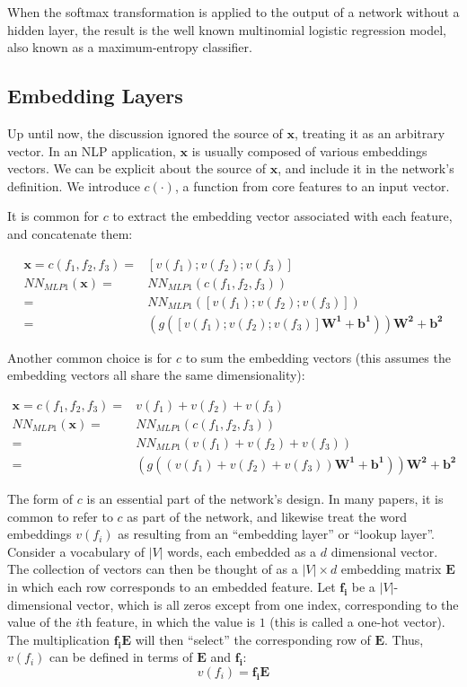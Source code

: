 \documentclass[jair,twoside,11pt,theapa]{article}
\newcommand{\m}[1]{\mathbf{#1}}%
\begin{document}
{When the softmax transformation is applied to the output of a network without a
hidden layer, the result is the well known multinomial logistic regression
model, also known as a maximum-entropy classifier.


\subsection{Embedding Layers}
\label{sec:embed-layer}

Up until now, the discussion ignored the source of $\m{x}$, treating it as an arbitrary
vector. In an NLP application, $\m{x}$ is usually composed of various embeddings
vectors.
We can be explicit about the source of $\m{x}$, and include it in the network's definition.
We introduce $c(\cdot)$, a function from core features to an input vector.

It is common for $c$ to extract the embedding vector associated with each feature, and concatenate them:

\begin{align*}
    \m{x} = c(f_1,f_2,f_3) =& [v(f_1);v(f_2);v(f_3)] \\
    NN_{MLP1}(\m{x}) =& NN_{MLP1}(c(f_1,f_2,f_3)) \\
    =& NN_{MLP1}([v(f_1);v(f_2);v(f_3)]) \\
    =& (g([v(f_1);v(f_2);v(f_3)]\m{W^1} + \m{b^1}))\m{W^2} + \m{b^2}  
\end{align*}

Another common choice is for $c$ to sum the embedding vectors (this assumes the
embedding vectors all share the same dimensionality):

\begin{align*}
    \m{x} = c(f_1,f_2,f_3) =& v(f_1)+v(f_2)+v(f_3) \\
    NN_{MLP1}(\m{x}) =& NN_{MLP1}(c(f_1,f_2,f_3)) \\ 
    =& NN_{MLP1}(v(f_1)+v(f_2)+v(f_3)) \\
    =& (g((v(f_1)+v(f_2)+v(f_3))\m{W^1} + \m{b^1}))\m{W^2} + \m{b^2}  
\end{align*}


The form of $c$ is an essential part of the network's design.
In many papers, it is common to refer to $c$ as part of the network,
and likewise treat the word embeddings $v(f_i)$ as resulting
from an ``embedding layer'' or ``lookup layer''. Consider a vocabulary of $|V|$
words, each embedded as a $d$ dimensional vector. The collection of vectors can
then be thought of as a $|V| \times d$ embedding matrix $\m{E}$ in which each row
corresponds to an embedded feature.
Let $\m{f_i}$ be a $|V|$-dimensional vector, which is all zeros except from one
index, corresponding to the value of the $i$th feature, in which the value is
$1$ (this is called a one-hot vector). The multiplication $\m{f_i}\m{E}$ will then
``select'' the corresponding row of $\m{E}$. Thus, $v(f_i)$ can be defined in
terms of $\m{E}$ and $\m{f_i}$:
\[ v(f_i) = \m{f_i} \m{E}  \]

}
\end{document}

